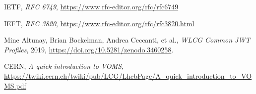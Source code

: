 \begin{thebibliography}{99}
	IETF, 
	\textit{RFC 6749},
	\url{https://www.rfc-editor.org/rfc/rfc6749}

	IEFT,
	\textit{RFC 3820},
	\url{https://www.rfc-editor.org/rfc/rfc3820.html}

	Mine Altunay, Brian Bockelman, Andrea Ceccanti, et al., \textit{WLCG Common JWT Profiles}, 2019,
	\url{https://doi.org/10.5281/zenodo.3460258}.

	CERN, \textit{A quick introduction to VOMS},
	\url{https://twiki.cern.ch/twiki/pub/LCG/LhcbPage/A_quick_introduction_to_VOMS.pdf}

\end{thebibliography}